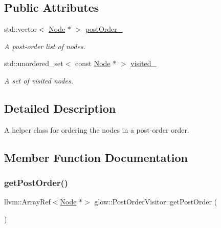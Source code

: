 \subsection*{Public Attributes}
\begin{DoxyCompactItemize}
\item 
\mbox{\label{structglow_1_1_post_order_visitor_a6981ced09710eaca86a6cae12899f4d4}} 
std\+::vector$<$ \hyperlink{classglow_1_1_node}{Node} $\ast$ $>$ \hyperlink{structglow_1_1_post_order_visitor_a6981ced09710eaca86a6cae12899f4d4}{post\+Order\+\_\+}
\begin{DoxyCompactList}\small\item\em A post-\/order list of nodes. \end{DoxyCompactList}\item 
\mbox{\label{structglow_1_1_post_order_visitor_a3b5b7598a7d520de1f821bd2be5bdf89}} 
std\+::unordered\+\_\+set$<$ const \hyperlink{classglow_1_1_node}{Node} $\ast$ $>$ \hyperlink{structglow_1_1_post_order_visitor_a3b5b7598a7d520de1f821bd2be5bdf89}{visited\+\_\+}
\begin{DoxyCompactList}\small\item\em A set of visited nodes. \end{DoxyCompactList}\end{DoxyCompactItemize}


\subsection{Detailed Description}
A helper class for ordering the nodes in a post-\/order order. 

\subsection{Member Function Documentation}
\mbox{\label{structglow_1_1_post_order_visitor_a781f079d8c1456522989adae267078fc}} 
\subsubsection{\texorpdfstring{get\+Post\+Order()}{getPostOrder()}}
{\footnotesize\ttfamily llvm\+::\+Array\+Ref$<$\hyperlink{classglow_1_1_node}{Node} $\ast$$>$ glow\+::\+Post\+Order\+Visitor\+::get\+Post\+Order (\begin{DoxyParamCaption}{ }\end{DoxyParamCaption})\hspace{0.3cm}{\ttfamily [inline]}}

